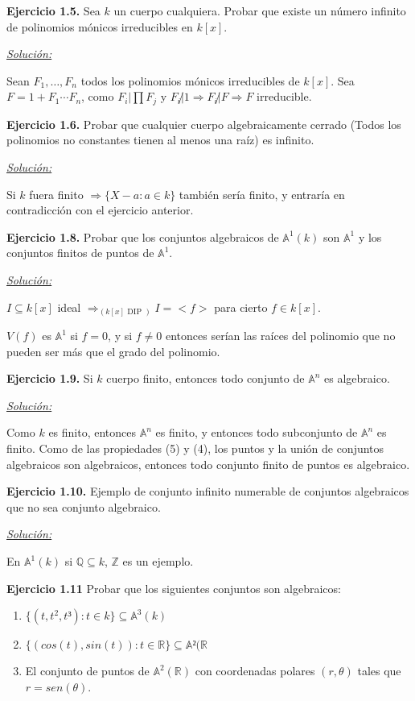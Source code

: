 \textbf{Ejercicio 1.5. } Sea $k$ un cuerpo cualquiera. Probar que existe un número infinito de polinomios mónicos irreducibles en $k[x]$. 

\underline{\textit{Solución: }}

Sean $F_1,\dots ,F_n$ todos los polinomios mónicos irreducibles de $k[x]$. Sea $F=1+F_1\cdots F_n$, como $F_i|\prod F_j$ y $F_i \not | 1 \Rightarrow F_i\not | F \Rightarrow F$ irreducible.

\textbf{Ejercicio 1.6. } Probar que cualquier cuerpo algebraicamente cerrado (Todos los polinomios no constantes tienen al menos una raíz) es infinito.

\underline{\textit{Solución: }}

Si $k$ fuera finito $\Rightarrow \{X-a : a\in k \}$ también sería finito, y entraría en contradicción con el ejercicio anterior.

\textbf{Ejercicio 1.8. } Probar que los conjuntos algebraicos de $\mathbb{A}^1(k)$ son $\mathbb{A}^1$ y los conjuntos finitos de puntos de $\mathbb{A}^1$.

\underline{\textit{Solución: }}

$I\subseteq k[x]$ ideal $\Rightarrow_{(k[x] \text{ DIP })}I=<f>$ para cierto $f\in k[x]$.

$V(f)$ es $\mathbb{A}^1$ si $f=0$, y si $f\neq 0$ entonces serían las raíces del polinomio  que no pueden ser más que el grado del polinomio.

\textbf{Ejercicio 1.9. } Si $k$ cuerpo finito, entonces todo conjunto de $\mathbb{A}^n$ es algebraico.

\underline{\textit{Solución: }}

Como $k$ es finito, entonces $\mathbb{A}^n$ es finito, y entonces todo subconjunto de $\mathbb{A}^n$ es finito. Como de las propiedades (5) y (4), los puntos y la unión de conjuntos algebraicos son algebraicos, entonces todo conjunto finito de puntos es algebraico.

\textbf{Ejercicio 1.10. } Ejemplo de conjunto infinito numerable de conjuntos algebraicos que no sea conjunto algebraico.

\underline{\textit{Solución: }}

En $\mathbb{A}^1(k)$ si $\mathbb{Q}\subseteq k$, $\mathbb{Z}$ es un ejemplo.

\textbf{Ejercicio 1.11 } Probar que los siguientes conjuntos son algebraicos:

\begin{enumerate}
\item $\{ (t,t^2,t³): t\in k \} \subseteq \mathbb{A}^3(k)$
\item $\{ (cos(t),sin(t)): t\in \mathbb{R} \} \subseteq \mathbb{A}²(\mathbb{R}$
\item El conjunto de puntos de $\mathbb{A}^2(\mathbb{R})$ con coordenadas polares $(r,\theta)$ tales que $r=sen(\theta)$.
\end{enumerate}

